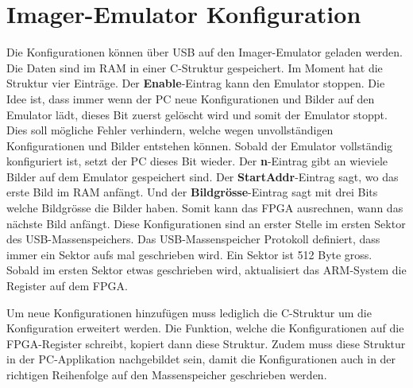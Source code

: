 \section{Imager-Emulator Konfiguration}
Die Konfigurationen können über USB auf den Imager-Emulator geladen werden. Die Daten sind im RAM in einer C-Struktur gespeichert. Im Moment hat die Struktur vier Einträge. Der \textbf{Enable}-Eintrag kann den Emulator stoppen. Die Idee ist, dass immer wenn der PC neue Konfigurationen und Bilder auf den Emulator lädt, dieses Bit zuerst gelöscht wird und somit der Emulator stoppt. Dies soll mögliche Fehler verhindern, welche wegen unvollständigen Konfigurationen und Bilder entstehen können. Sobald der Emulator vollständig konfiguriert ist, setzt der PC dieses Bit wieder. Der \textbf{n}-Eintrag gibt an wieviele Bilder auf dem Emulator gespeichert sind. Der \textbf{StartAddr}-Eintrag sagt, wo das erste Bild im RAM anfängt. Und der \textbf{Bildgrösse}-Eintrag sagt mit drei Bits welche Bildgrösse die Bilder haben. Somit kann das FPGA ausrechnen, wann das nächste Bild anfängt. Diese Konfigurationen sind an erster Stelle im ersten Sektor des USB-Massenspeichers. Das USB-Massenspeicher Protokoll definiert, dass immer ein Sektor aufs mal geschrieben wird. Ein Sektor ist 512 Byte gross. Sobald im ersten Sektor etwas geschrieben wird, aktualisiert das ARM-System die Register auf dem FPGA.

Um neue Konfigurationen hinzufügen muss lediglich die C-Struktur um die Konfiguration erweitert werden. Die Funktion, welche die Konfigurationen auf die FPGA-Register schreibt, kopiert dann diese Struktur. Zudem muss diese Struktur in der PC-Applikation nachgebildet sein, damit die Konfigurationen auch in der richtigen Reihenfolge auf den Massenspeicher geschrieben werden.